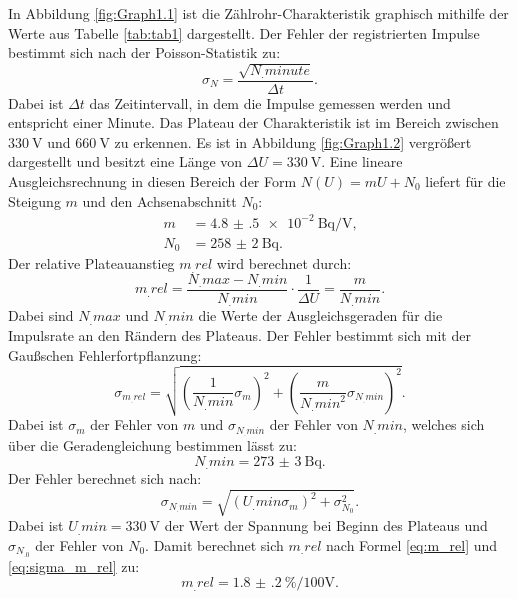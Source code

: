 In Abbildung \ref{fig:Graph1.1} ist die Zählrohr-Charakteristik graphisch mithilfe der Werte aus Tabelle \ref{tab:tab1} dargestellt. Der Fehler der registrierten Impulse bestimmt sich nach der Poisson-Statistik zu:
\begin{equation*}
\sigma_N = \frac{\sqrt{N_.{minute}}}{\Delta t}\text{.}
\end{equation*}
Dabei ist $\Delta t$ das Zeitintervall, in dem die Impulse gemessen werden und entspricht einer Minute.
Das Plateau der Charakteristik ist im Bereich zwischen $\SI{330}{\volt}$ und $\SI{660}{\volt}$ zu erkennen. Es ist in Abbildung \ref{fig:Graph1.2} vergrößert dargestellt und besitzt eine Länge von $\Delta U = \SI{330}{\volt}$.
Eine lineare Ausgleichsrechnung in diesen Bereich der Form $N(U)=mU+N_0$ liefert für die Steigung $m$ und den Achsenabschnitt $N_0$:
\begin{align*}
m 	&= \SI{4.8(5)e-2}{\becquerel\per\volt} \text{,}\\
N_0	&= \SI{258(2)}{\becquerel}\text{.}
\end{align*}   
Der relative Plateauanstieg $m_.{rel}$ wird berechnet durch:
\begin{equation}
m_.{rel} = \frac{N_.{max}-N_.{min}}{N_.{min}}\cdot\frac{1}{\Delta U} = \frac{m}{N_.{min}}\text{.} \label{eq:m_rel}
\end{equation}
Dabei sind $N_.{max}$ und $N_.{min}$ die Werte der Ausgleichsgeraden für die Impulsrate an den Rändern des Plateaus. 
Der Fehler bestimmt sich mit der Gaußschen Fehlerfortpflanzung:
\begin{equation}
\sigma_{m_.{rel}} = \sqrt{\left(\frac{1}{N_.{min}}\sigma_m\right)^2+\left(\frac{m}{N_.{min}^2}\sigma_{N_.{min}}\right)^2}\text{.} \label{eq:sigma_m_rel}
\end{equation}
Dabei ist $\sigma_m$ der Fehler von $m$ und $\sigma_{N_.{min}}$ der Fehler von $N_.{min}$, welches sich über die Geradengleichung bestimmen lässt zu:
\begin{equation*}
N_.{min} = \SI{273(3)}{\becquerel} \text{.}
\end{equation*}
Der Fehler berechnet sich nach:
\begin{equation*}
\sigma_{N_.{min}} =  \sqrt{\left(U_.{min}\sigma_m\right)^2+\sigma_{N_0}^2}\text{.}
\end{equation*}
Dabei ist $U_.{min}=\SI{330}{\volt}$ der Wert der Spannung bei Beginn des Plateaus und $\sigma_{N_.0}$ der Fehler von $N_0$.
Damit berechnet sich $m_.{rel}$ nach Formel \eqref{eq:m_rel} und \eqref{eq:sigma_m_rel} zu:
\begin{equation*}
m_.{rel} = \SI{1.8(2)}{\%\per 100\volt}\text{.}
\end{equation*}

